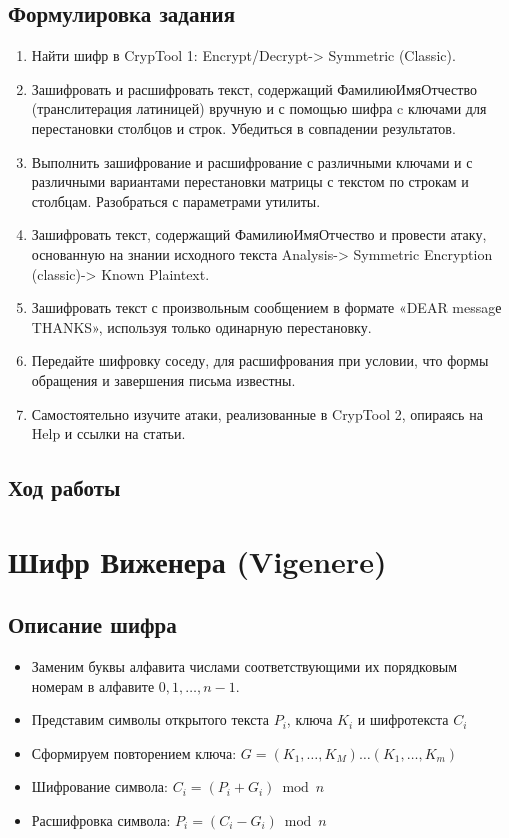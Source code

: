 \documentclass[a4paper, 14pt]{extarticle}
\begin{document}
\subsection{Формулировка задания}
\begin{enumerate}
    \item Найти шифр в CrypTool 1: Encrypt/Decrypt-> Symmetric (Classic).
    \item Зашифровать и расшифровать текст, содержащий ФамилиюИмяОтчество (транслитерация латиницей) вручную и с помощью шифра c ключами для перестановки столбцов и строк. Убедиться в совпадении результатов.
    \item Выполнить зашифрование и расшифрование с различными ключами и с различными вариантами перестановки матрицы с текстом по строкам и столбцам. Разобраться с параметрами утилиты.
    \item Зашифровать текст, содержащий ФамилиюИмяОтчество и провести атаку, основанную на знании исходного текста Analysis-> Symmetric Encryption (classic)-> Known Plaintext. 
    \item Зашифровать текст с произвольным сообщением в формате «DEAR messagе THANKS», используя только одинарную перестановку.
    \item Передайте шифровку соседу, для расшифрования при условии, что формы обращения и завершения письма известны.
    \item Самостоятельно изучите атаки, реализованные в CrypTool 2, опираясь на Help и ссылки на статьи.
\end{enumerate}

\subsection{Ход работы}
\lipsum[1]

\section{Шифр Виженера (Vigenere)}
\subsection{Описание шифра}
\begin{itemize}
    \item Заменим буквы алфавита числами соответствующими их порядковым номерам в алфавите $0, 1, \ldots, n-1$.
    \item Представим символы открытого текста $P_i$, ключа $K_i$ и шифротекста $C_i$
    \item Сформируем  повторением ключа: $G=(K_1, \ldots, K_M) \ldots (K_1, \ldots, K_m)$
    \item Шифрование символа: $C_i = (P_i + G_i) \bmod n$
    \item Расшифровка символа: $P_i = (C_i - G_i) \bmod n$
\end{itemize}
\end{document}
